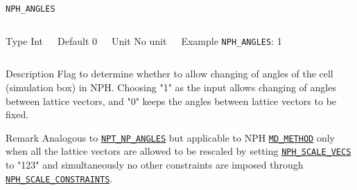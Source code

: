 \begin{frame}[allowframebreaks]{\texttt{NPH\_ANGLES}} \label{NPH_ANGLES}
\vspace*{-12pt}
\begin{columns}
\begin{block}{Type}
Int
\end{block}

\begin{block}{Default}
0
\end{block}

\begin{block}{Unit}
No unit
\end{block}

\begin{block}{Example}
\texttt{NPH\_ANGLES}: 1
\end{block}
\end{columns}

\begin{block}{Description}
Flag to determine whether to allow changing of angles of the cell (simulation box) in NPH. Choosing "1" as the input allows changing of angles between lattice vectors, and "0" keeps the angles between lattice vectors to be fixed.
\end{block}

\begin{block}{Remark}
Analogous to \hyperlink{NPT_NP_ANGLES}{\texttt{NPT\_NP\_ANGLES}} but applicable to NPH \hyperlink{MD_METHOD}{\texttt{MD\_METHOD}} only when all the lattice vectors are allowed to be rescaled by setting \hyperlink{NPH_SCALE_VECS}{\texttt{NPH\_SCALE\_VECS}} to "123" and simultaneously no other constraints are imposed through \hyperlink{NPH_SCALE_CONSTRAINTS}{\texttt{NPH\_SCALE\_CONSTRAINTS}}.
\end{block}

\end{frame}



